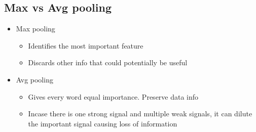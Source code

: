 \documentclass[a4paper]{article}
\begin{document}
\subsection{Max vs Avg pooling}
\begin{itemize}
    \item Max pooling
    \begin{itemize}
        \item Identifies the most important feature
        \item Discards other info that could potentially be useful
    \end{itemize}
    \item Avg pooling
    \begin{itemize}
        \item Gives every word equal importance. Preserve data info
        \item Incase there is one strong signal and multiple weak signals, it can dilute the important signal causing loss of information
    \end{itemize}
\end{itemize}
\end{document}
